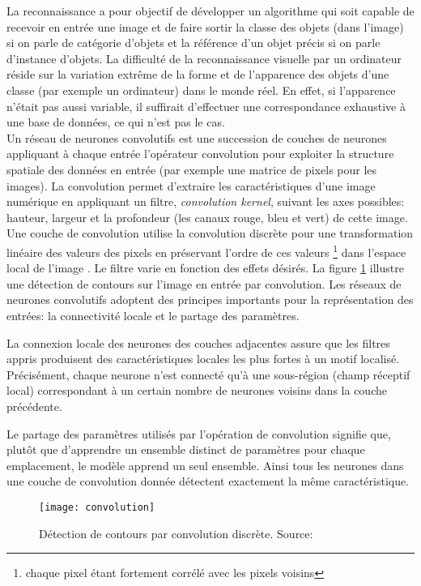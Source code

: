 La reconnaissance a pour objectif de développer un algorithme qui soit capable de recevoir en entrée une image et de faire sortir la classe des objets (dans l'image) si on parle de catégorie d'objets et la référence d'un objet précis si on parle d'instance d'objets.
La difficulté de la reconnaissance visuelle par un ordinateur réside sur la variation extrême de la forme et de l'apparence des objets d'une classe (par exemple un ordinateur) dans le monde réel. En effet, si l'apparence n'était pas aussi variable, il suffirait d'effectuer une correspondance exhaustive à une base de données, ce qui n'est pas le cas.	\\
\smallskip
Un réseau de neurones convolutifs est une succession de couches de neurones appliquant à chaque entrée l'opérateur convolution pour exploiter la structure spatiale des données en entrée (par exemple une matrice de pixels pour les images). La convolution permet d'extraire les caractéristiques d'une image numérique en appliquant un filtre, \textit{convolution kernel}, suivant les axes possibles: hauteur, largeur et la profondeur (les canaux rouge, bleu et vert) de cette image. Une couche de convolution utilise la convolution discrète pour une transformation linéaire des valeurs des pixels en préservant l'ordre de ces valeurs \footnote{chaque pixel étant fortement corrélé avec les pixels voisins} dans l'espace local de l'image . Le filtre varie en fonction des effets désirés. La figure \ref{detectcont} illustre une détection de contours sur l'image en entrée par convolution.
Les réseaux de neurones convolutifs adoptent des principes importants pour la représentation des entrées: la connectivité locale et le partage des paramètres.

La connexion locale des neurones des couches adjacentes assure que les filtres appris produisent des caractéristiques locales les plus fortes à un motif  localisé. Précisément, chaque neurone n'est connecté qu'à une sous-région (champ réceptif local) correspondant à un certain nombre de neurones voisins dans la couche précédente.

Le partage des paramètres utilisés par l'opération de convolution signifie que, plutôt que d'apprendre un ensemble distinct de paramètres pour chaque emplacement, le modèle apprend un seul ensemble. Ainsi tous les neurones dans une couche de convolution donnée détectent exactement la même caractéristique. 
\medskip
\begin{figure}[h]
	\begin{center}
	 	
		\texttt{[image: convolution]} 
		\caption{Détection de contours par convolution discrète. Source: \cite{wikipedia} \label{detectcont}}
	\end{center}

\end{figure}

